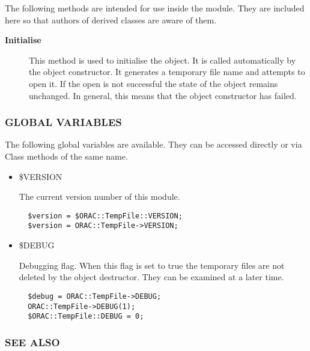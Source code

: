 The following methods are intended for use inside the module.
They are included here so that authors of derived classes are
aware of them.

\begin{description}

\item[{\textbf{Initialise}}] \mbox{}

This method is used to initialise the object. It is called
automatically by the object constructor. It generates
a temporary file name and attempts to open it. If the
open is not successful the state of the object remains
unchanged. In general, this means that the object
constructor has failed.

\end{description}
\subsubsection*{GLOBAL VARIABLES\label{ORAC::TempFile_GLOBAL_VARIABLES}}


The following global variables are available.
They can be accessed directly or via Class methods of the same name.

\begin{itemize}

\item \$VERSION

The current version number of this module.

\begin{verbatim}
  $version = $ORAC::TempFile::VERSION;
  $version = ORAC::TempFile->VERSION;
\end{verbatim}

\item \$DEBUG

Debugging flag. When this flag is set to true the temporary
files are not deleted by the object destructor. They can be
examined at a later time.

\begin{verbatim}
  $debug = ORAC::TempFile->DEBUG;
  ORAC::TempFile->DEBUG(1);
  $ORAC::TempFile::DEBUG = 0;
\end{verbatim}
\end{itemize}
\subsubsection*{SEE ALSO\label{ORAC::TempFile_SEE_ALSO}}


